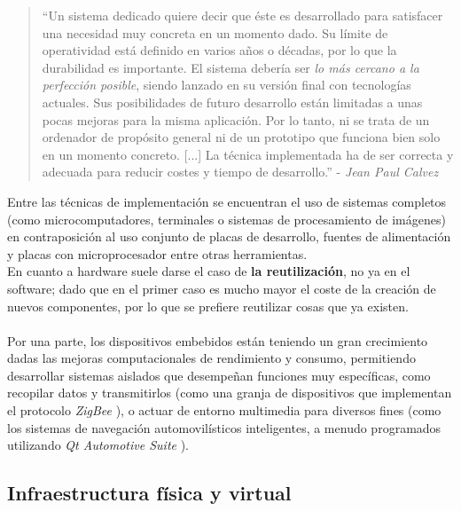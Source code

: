 \begin{quotation}
	``Un sistema dedicado quiere decir que éste es desarrollado para satisfacer una necesidad muy concreta en un momento dado. Su límite de operatividad está definido en varios años o décadas, por lo que la durabilidad es importante. El sistema debería ser \textit{lo más cercano a la perfección posible}, siendo lanzado en su versión final con tecnologías actuales. Sus posibilidades de futuro desarrollo están limitadas a unas pocas mejoras para la misma aplicación. Por lo tanto, ni se trata de un ordenador de propósito general ni de un prototipo que funciona bien solo en un momento concreto. [...] La técnica implementada ha de ser correcta y adecuada para reducir costes y tiempo de desarrollo.'' - \textit{Jean Paul Calvez} \cite{embedded-real-time-systems-embedded-systems}
\end{quotation}

Entre las técnicas de implementación se encuentran el uso de sistemas completos (como microcomputadores, terminales o sistemas de procesamiento de imágenes) en contraposición al uso conjunto de placas de desarrollo, fuentes de alimentación y placas con microprocesador entre otras herramientas.\\

En cuanto a hardware suele darse el caso de \textbf{la reutilización}, no ya en el software; dado que en el primer caso es mucho mayor el coste de la creación de nuevos componentes, por lo que se prefiere reutilizar cosas que ya existen.\\

\noindent\makebox[\linewidth]{\rule{\textwidth}{0.4pt}}\\

Por una parte, los dispositivos embebidos están teniendo un gran crecimiento dadas las mejoras computacionales de rendimiento y consumo, permitiendo desarrollar sistemas aislados que desempeñan funciones muy específicas, como recopilar datos y transmitirlos (como una granja de dispositivos que implementan el protocolo \textit{ZigBee} \cite{zigbee-products}), o actuar de entorno multimedia para diversos fines (como los sistemas de navegación automovilísticos inteligentes, a menudo programados utilizando \textit{Qt Automotive Suite} \cite{qt-automotive}).\\

\subsection{Infraestructura física y virtual}

